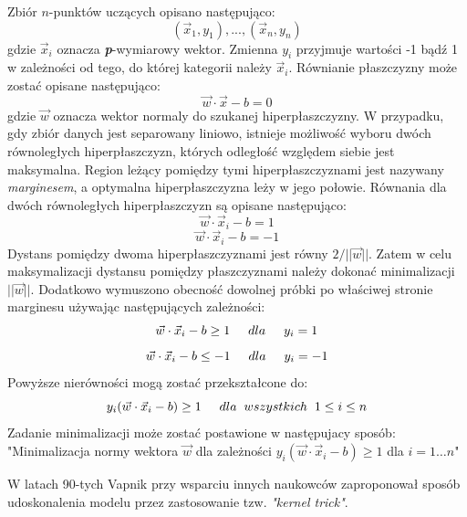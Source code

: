 Zbiór $n$-punktów uczących opisano następująco:
\begin{equation}
(\vec{x}_1,y_1), ..., (\vec{x}_n,y_n)
\end{equation}
gdzie $\vec{x}_i$ oznacza \textit{\textbf{p}}-wymiarowy wektor. Zmienna $y_i$ przyjmuje wartości -1 bądź 1 w zależności od tego, do której kategorii należy $\vec{x}_i$. Równianie płaszczyzny może zostać opisane następująco:
\begin{equation}
\vec{w}\cdot \vec{x} - b = 0
\end{equation}
gdzie $\vec{w}$ oznacza wektor normaly do szukanej hiperpłaszczyzny. W przypadku, gdy zbiór danych jest separowany liniowo, istnieje możliwość wyboru dwóch równoległych hiperpłaszczyzn, których odległość względem siebie jest maksymalna. Region leżący pomiędzy tymi hiperpłaszczyznami jest nazywany \textit{marginesem}, a optymalna hiperpłaszczyzna leży w jego połowie. Równania dla dwóch równoległych hiperpłaszczyzn są opisane następująco:
\begin{equation}
\vec{w}\cdot \vec{x}_i - b = 1
\end{equation}
\begin{equation}
\vec{w}\cdot \vec{x}_i - b = -1
\end{equation}
Dystans pomiędzy dwoma hiperpłaszczyznami jest równy $2 /||\vec{w}||$. Zatem w celu maksymalizacji dystansu pomiędzy płaszczyznami należy dokonać minimalizacji $||\vec{w}||$. Dodatkowo wymuszono obecność dowolnej próbki po właściwej stronie marginesu używając następujących zależności:
\begin{equation}
\vec{w}\cdot \vec{x}_i - b \geq 1 \hspace{0.5cm} dla \hspace{0.5cm} y_i = 1 
\end{equation}
\begin{equation}
\vec{w}\cdot \vec{x}_i - b \leq -1 \hspace{0.5cm} dla \hspace{0.5cm} y_i = -1
\end{equation}
Powyższe nierówności mogą zostać przekształcone do:
\begin{equation}
y_i(\vec{w}\cdot \vec{x}_i - b) \geq 1 \hspace{0.5cm} dla \hspace{0.2cm} wszystkich \hspace{0.2cm} 1 \leq i \leq n
\end{equation}
Zadanie minimalizacji może zostać postawione w następujacy sposób:
"Minimalizacja normy wektora $\vec{w}$ dla zależności $y_i(\vec{w}\cdot \vec{x}_i - b) \geq 1$ dla $i=1 \ldots n$"


W latach 90-tych Vapnik przy wsparciu innych naukowców zaproponował sposób udoskonalenia modelu przez zastosowanie tzw. \textit{"kernel trick"}.



















